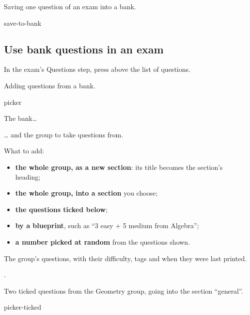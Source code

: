 \documentclass[11pt]{article}
\begin{document}
\begin{guidefig}{Saving one question of an exam into a bank.}
\begin{shot}[0.52\linewidth]{save-to-bank}\end{shot}
\end{guidefig}

\subsection{Use bank questions in an exam}\label{sec:bank-use}

In the exam's Questions step, press  above the list of questions.

\begin{keep}
\begin{guidefig}{Adding questions from a bank.}
\begin{shot}{picker}
\end{shot}
\end{guidefig}
\begin{callouts}
  \item The bank\ldots
  \item \ldots{} and the group to take questions from.
  \item What to add:
    \begin{itemize}
      \item \textbf{the whole group, as a new section}: its title becomes the section's heading;
      \item \textbf{the whole group, into a section} you choose;
      \item \textbf{the questions ticked below};
      \item \textbf{by a blueprint}, such as ``3 easy + 5 medium from Algebra'';
      \item \textbf{a number picked at random} from the questions shown.
    \end{itemize}
  \item The group's questions, with their difficulty, tags and when they were last printed.
  \item {}.
\end{callouts}
\end{keep}

\begin{guidefig}{Two ticked questions from the Geometry group, going into the section ``general''.}
\begin{shot}{picker-ticked}
\end{shot}
\end{guidefig}
\end{document}
